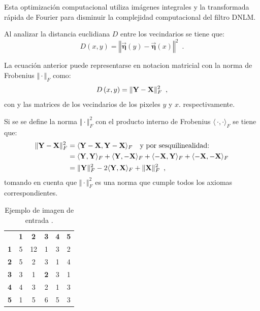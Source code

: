 Esta optimización computacional utiliza im\'agenes integrales y la transformada r\'apida de Fourier para disminuir la complejidad computacional del filtro DNLM. 



Al analizar la distancia euclidiana $D$ entre los vecindarios se tiene que:
%
\begin{equation}
D\left(x,y\right)=\left\Vert \vec{\boldsymbol{\eta}}\left(y\right)-\vec{\boldsymbol{\eta}}\left(x\right)\right\Vert^2 \enspace . 
\end{equation}

La ecuación anterior puede representarse en notacion matricial con la norma de Frobenius $\Vert \cdot \Vert_{F}$ como:
%
\begin{equation}
D\left(x,y\right)=\Vert \mathbf{Y} - \mathbf{X} \Vert_{F}^2 \enspace ,
\label{eq:distMat}
\end{equation}
%
con  y  las matrices de los vecindarios de los pixeles $y$ y $x$. respectivamente.

Si se se define la norma $\Vert \cdot \Vert_{F}^2$ con el producto interno de Frobenius $\langle\,\cdot,\cdot\rangle_{F}$ se tiene que:
%
\begin{equation}\label{eq:frobProd}
\begin{split}
\Vert \mathbf{Y} - \mathbf{X} \Vert_{F}^2 & = \langle\mathbf{Y} - \mathbf{X},\mathbf{Y} - \mathbf{X}\rangle_{F}  \quad \text{y por sesquilinealidad:}\\ 
& = \langle\mathbf{Y},\mathbf{Y}\rangle_{F} + \langle\mathbf{Y},-\mathbf{X}\rangle_{F} + \langle-\mathbf{X},\mathbf{Y}\rangle_{F} + \langle-\mathbf{X},-\mathbf{X}\rangle_{F}\\
& = \Vert \mathbf{Y} \Vert_{F}^2 -2\langle\mathbf{Y},\mathbf{X}\rangle_{F} + \Vert \mathbf{X} \Vert_{F}^2 \enspace ,
\end{split} 
\end{equation}
%
tomando en cuenta que $\Vert \cdot \Vert_{F}^2$ es una norma que cumple todos los axiomas correspondientes. 

\begin{table}[htb]
\begin{center}
\caption{Ejemplo de imagen de entrada .\label{table:imageExample}}

\renewcommand{\arraystretch}{1.4}
\setlength\tabcolsep{3pt}

{
\begin{tabular}{cc|ccc|c}
 & \multicolumn{1}{c}{\textbf{1}} & \textbf{2} & \textbf{3} & \multicolumn{1}{c}{\textbf{4}} & \textbf{5}\tabularnewline
\textbf{1} & \multicolumn{1}{c}{5} & 12 & 1 & \multicolumn{1}{c}{3} & 2\tabularnewline
\cline{3-5} 
\textbf{2} & 5 & 2 & 3 & 1 & 4\tabularnewline
\textbf{3} & 3 & 1 & \textbf{2} & 3 & 1\tabularnewline
\textbf{4} & 4 & 3 & 2 & 1 & 3\tabularnewline
\cline{3-5} 
\textbf{5} & \multicolumn{1}{c}{1} & 5 & 6 & \multicolumn{1}{c}{5} & 3\tabularnewline
\end{tabular}
}
\par\end{center} 
\end{table}

